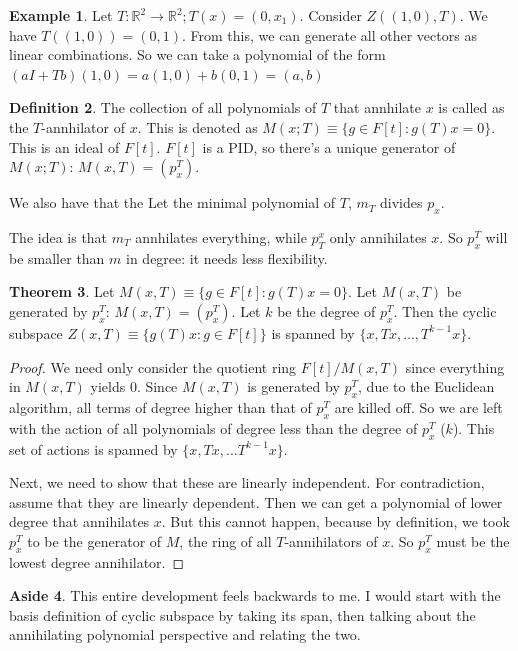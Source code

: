 \documentclass{book}
\newcommand{\R}{\ensuremath{\mathbb{R}}}
\theoremstyle{definition}
\newtheorem{theorem}{Theorem}
\newtheorem{example}[theorem]{Example}
\newtheorem{aside}[theorem]{Aside}
\newtheorem{definition}[theorem]{Definition}
\begin{document}
\begin{example}
Let $T: \R^2 \rightarrow \R^2; T(x) = (0, x_1)$. Consider
$Z((1, 0), T)$. We have $T((1, 0)) = (0, 1)$. From this, we can
generate all other vectors as linear combinations. So we can
take a polynomial of the form $(aI + Tb)(1, 0) = a(1, 0) + b(0, 1) = (a, b)$
\end{example}

\begin{definition}
The collection of all polynomials of $T$ that annhilate $x$
is called as the $T$-annhilator of $x$. This is denoted as
$M(x; T) \equiv \{ g \in F[t] : g(T) x = 0 \}$.
This is an ideal of $F[t]$. $F[t]$ is a PID, so there's a unique generator
of $M(x; T)$: $M(x, T) = (p^T_x)$.

We also have that the Let the minimal polynomial of $T$, $m_T$ divides
$p_x$.  

The idea is that $m_T$ annhilates everything, while $p_T^x$ only annihilates $x$.
So $p^T_x$ will be smaller than $m$ in degree: it needs less flexibility.
\end{definition}

\begin{theorem}
Let $M(x, T) \equiv \{ g \in F[t]: g(T) x = 0 \}$. Let $M(x, T)$ be generated
by $p^T_x$: $M(x, T) = (p^T_x)$. Let $k$ be the degree of $p^T_x$. Then the
cyclic subspace $Z(x, T) \equiv \{ g(T)x : g \in F[t]\}$ is spanned
by $\{ x, Tx, \dots, T^{k-1} x\}$.
\end{theorem}
\begin{proof}
We need only consider the quotient ring $F[t]/M(x, T)$ since everything in 
$M(x, T)$ yields $0$. Since $M(x, T)$ is generated by $p^T_x$, due to the
Euclidean algorithm, all terms of degree higher than that of $p^T_x$
are killed off. So we are left with the action of
all polynomials of degree less than the degree of $p^T_x$ ($k$).
This set of actions is spanned by $\{ x, Tx, \dots T^{k-1} x \}$.

Next, we need to show that these are linearly independent. For contradiction,
assume that they are linearly dependent. Then we can get a polynomial of lower
degree that annihilates $x$. But this cannot happen, because by definition, we
took $p^T_x$ to be the generator of $M$, the ring of all $T$-annihilators of
$x$. So $p^T_x$ must be the lowest degree annihilator.
\end{proof}

\begin{aside} This entire development feels backwards to me. I would start
with the basis definition of cyclic subspace by taking its span, then talking
about the annihilating polynomial perspective and relating the two.
\end{aside}
\end{document}
